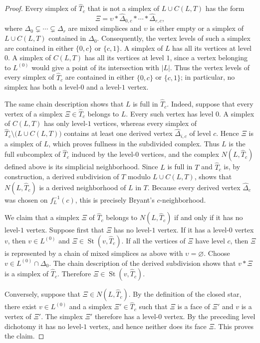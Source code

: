 \documentclass[12pt,oneside,a4paper]{article}
\theoremstyle{mytheorem}
\theoremstyle{remark}
\theoremstyle{definition}
\begin{document}
\begin{proof}
Every simplex of $\widehat T_c$ that is not a simplex of
$L\cup C(L,T)$ has the form
\[
\Xi=\upsilon*\widehat\Delta_{0,c}*\cdots*
\widehat\Delta_{r,c},
\]
where $\Delta_0\subsetneq\cdots\subsetneq\Delta_r$ are mixed simplices
and $\upsilon$ is either empty or a simplex of $L\cup C(L,T)$ contained
in $\Delta_0$.  Consequently, the vertex levels of such a simplex are
contained in either $\{0,c\}$ or $\{c,1\}$.  A simplex of $L$ has all
its vertices at level $0$.  A simplex of $C(L,T)$ has all its vertices
at level $1$, since a vertex belonging to $L^{(0)}$ would give a point
of its intersection with $|L|$.  Thus the vertex levels of every
simplex of $\widehat T_c$ are contained in either $\{0,c\}$ or
$\{c,1\}$; in particular, no simplex has both a level-$0$ and a
level-$1$ vertex.

The same chain description shows that $L$ is full in $\widehat T_c$.
Indeed, suppose that every vertex of a simplex
$\Xi\in\widehat T_c$ belongs to $L$.  Every such vertex has level
$0$.  A simplex of $C(L,T)$ has only level-$1$ vertices, whereas every
simplex of
$\widehat T_c\setminus\bigl(L\cup C(L,T)\bigr)$ contains at least one
derived vertex $\widehat\Delta_{i,c}$ of level $c$.  Hence $\Xi$ is a
simplex of $L$, which proves fullness in the subdivided complex.
Thus $L$ is the full subcomplex of $\widehat T_c$ induced by the
level-$0$ vertices, and the complex $N(L,\widehat T_c)$ defined above
is its simplicial neighborhood.  Since $L$ is full in $T$ and
$\widehat T_c$ is, by construction, a derived subdivision of $T$
modulo $L\cup C(L,T)$,
\cite[\S3, pp.~227--228]{zbMATH01714503} shows that
$N(L,\widehat T_c)$ is a derived neighborhood of $L$ in $T$.
Because every derived vertex $\widehat\Delta_c$ was chosen on
$f_L^{-1}(c)$, this is precisely Bryant's $c$-neighborhood.

We claim that a simplex $\Xi$ of $\widehat T_c$ belongs to
$N(L,\widehat T_c)$ if and only if it has no level-$1$ vertex.  Suppose
first that $\Xi$ has no level-$1$ vertex.  If it has a level-$0$ vertex
$v$, then $v\in L^{(0)}$ and
$\Xi\in\operatorname{St}(v,\widehat T_c)$.  If all the vertices of
$\Xi$ have level $c$, then $\Xi$ is represented by a chain of mixed
simplices as above with $\upsilon=\varnothing$.  Choose
$v\in L^{(0)}\cap\Delta_0$.  The chain description of the derived
subdivision shows that $v*\Xi$ is a simplex of $\widehat T_c$.
Therefore $\Xi\in\operatorname{St}(v,\widehat T_c)$.

Conversely, suppose that $\Xi\in N(L,\widehat T_c)$.  By the definition
of the closed star, there exist $v\in L^{(0)}$ and a simplex
$\Xi'\in\widehat T_c$ such that $\Xi$ is a face of $\Xi'$ and $v$ is a
vertex of $\Xi'$.  The simplex $\Xi'$ therefore has a level-$0$ vertex.
By the preceding level dichotomy it has no level-$1$ vertex, and hence
neither does its face $\Xi$.  This proves the claim.


\end{proof}
\end{document}
